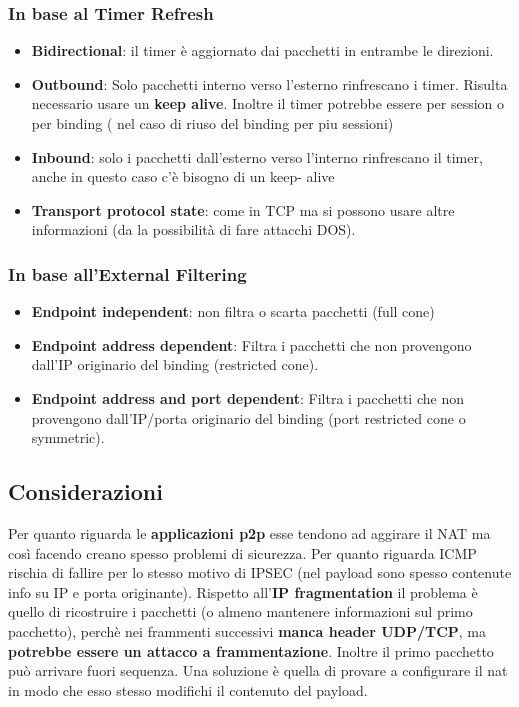 \documentclass[12pt]{article}
\begin{document}
			\subsubsection{In base al Timer Refresh}
				\begin{itemize}
					\item \textbf{Bidirectional}: il timer è aggiornato dai pacchetti in entrambe le direzioni.
					\item \textbf{Outbound}: Solo pacchetti interno verso l'esterno rinfrescano i timer. Risulta necessario usare un \textbf{keep alive}. Inoltre il timer potrebbe essere per session o per binding ( nel caso di riuso del binding per piu sessioni)
					\item \textbf{Inbound}: solo i pacchetti dall'esterno verso l'interno rinfrescano il timer, anche in questo caso c'è bisogno di un keep- alive
					\item \textbf{Transport protocol state}: come in TCP ma si possono usare altre informazioni (da la possibilità di fare attacchi DOS).
				\end{itemize}
			\subsubsection{In base all'External Filtering }
				\begin{itemize}
					\item \textbf{Endpoint independent}: non filtra o scarta pacchetti (full cone)
					\item \textbf{Endpoint address dependent}: Filtra i pacchetti che non provengono dall'IP originario del binding (restricted cone).
					\item \textbf{Endpoint address and port dependent}:  Filtra i pacchetti che non provengono dall'IP/porta originario del binding (port restricted cone o symmetric).
				\end{itemize}
			\subsection{Considerazioni}
				Per quanto riguarda le \textbf{applicazioni p2p} esse tendono ad aggirare il NAT ma così facendo creano spesso problemi di sicurezza. Per quanto riguarda ICMP rischia di fallire per lo stesso motivo di IPSEC (nel payload sono spesso contenute info su IP e porta originante). Rispetto all'\textbf{IP fragmentation} il problema è quello di ricostruire i pacchetti (o almeno mantenere informazioni sul primo pacchetto), perchè nei frammenti successivi \textbf{manca header UDP/TCP}, ma \textbf{potrebbe essere un attacco a frammentazione}. Inoltre il primo pacchetto può arrivare fuori sequenza. Una soluzione è quella di provare a configurare il nat in modo che esso stesso modifichi il contenuto del payload.
\end{document}
